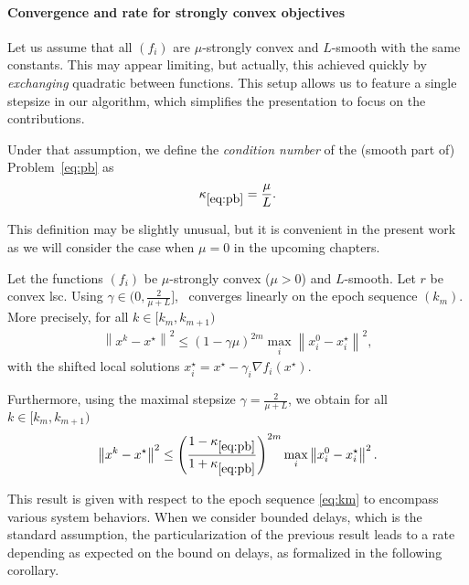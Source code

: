 \paragraph{Convergence and rate for strongly convex objectives}

Let us assume that all $(f_i)$ are $\mu$-strongly convex and $L$-smooth with the same constants. This may appear limiting, but actually, this achieved quickly by \emph{exchanging} quadratic between functions. This setup allows us to feature a single stepsize in our algorithm, which simplifies the presentation to focus on the contributions.

Under that assumption, we define the \emph{condition number} of the (smooth part of) Problem~\eqref{eq:pb} as 
$$\kappa_{\eqref{eq:pb}} = \frac{\mu}{L}.$$

This definition may be slightly unusual, but it is convenient in the present work as we will consider the case when $\mu=0$ in the upcoming chapters. 


\begin{theorem} \label{th:davepg}
Let the functions $(f_i)$ be $\mu$-strongly convex ($\mu>0$) and $L$-smooth. Let $r$ be convex lsc. Using $\gamma \in (0, \frac{2}{\mu + L}]$, \dave~converges linearly on the epoch sequence $(k_m)$. More precisely, for all $k\in [k_m, k_{m+1})$
\begin{align*}
    \left\| x^k - x^\star \right\|^2 \le \left(1 - \gamma \mu  \right)^{2m} \max_i\left\|x_i^0-x_i^\star\right\|^2,
\end{align*}
with the shifted local solutions $x_i^\star = x^\star - \gamma_i\nabla f_i(x^\star)$. 

Furthermore, using the maximal stepsize $\gamma = \frac{2}{\mu + L}$, we obtain for all $k\in [k_m, k_{m+1})$
\begin{align*}
    \left\| x^k - x^\star \right\|^2 \le \left( \frac{1-\kappa_{\eqref{eq:pb}}}{1+\kappa_{\eqref{eq:pb}}}  \right)^{2m} \max_i\left\|x_i^0-x_i^\star\right\|^2.
\end{align*}
\end{theorem}

This result is given with respect to the epoch sequence \eqref{eq:km} to encompass various system behaviors. When we consider bounded delays, which is the standard assumption, the particularization of the previous result leads to a rate depending as expected on the bound on delays, as formalized in the following corollary. 


